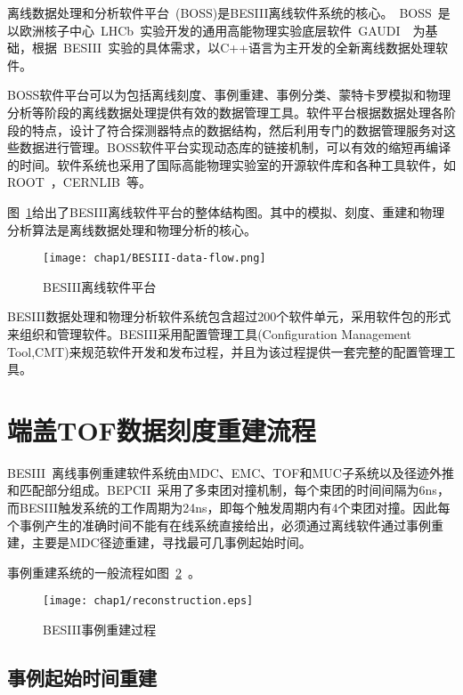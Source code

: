 离线数据处理和分析软件平台~\cite{liwd:2006}(BOSS)是BESIII离线软件系统的核心。~BOSS~是以欧洲核子中心~LHCb~实验开发的通用高能物理实验底层软件~GAUDI~~\cite{Barrand:2000}为基础，根据~BESIII~实验的具体需求，以C++语言为主开发的全新离线数据处理软件。

BOSS软件平台可以为包括离线刻度、事例重建、事例分类、蒙特卡罗模拟和物理分析等阶段的离线数据处理提供有效的数据管理工具。软件平台根据数据处理各阶段的特点，设计了符合探测器特点的数据结构，然后利用专门的数据管理服务对这些数据进行管理。BOSS软件平台实现动态库的链接机制，可以有效的缩短再编译的时间。软件系统也采用了国际高能物理实验室的开源软件库和各种工具软件，如ROOT~\cite{root}，CERNLIB~\cite{cern}等。


图~\ref{fig:BESIII-software}给出了BESIII离线软件平台的整体结构图。其中的模拟、刻度、重建和物理分析算法是离线数据处理和物理分析的核心。
\begin{figure}[!h]
  \centering
  \texttt{[image: chap1/BESIII-data-flow.png]}
  \caption{BESIII离线软件平台}
  \label{fig:BESIII-software}
\end{figure}

BESIII数据处理和物理分析软件系统包含超过200个软件单元，采用软件包的形式来组织和管理软件。BESIII采用配置管理工具(Configuration Management Tool,CMT)来规范软件开发和发布过程，并且为该过程提供一套完整的配置管理工具。%

\section{端盖TOF数据刻度重建流程}
BESIII~离线事例重建软件系统由MDC、EMC、TOF和MUC子系统以及径迹外推和匹配部分组成。BEPCII~采用了多束团对撞机制，每个束团的时间间隔为6ns，而BESIII触发系统的工作周期为24ns，即每个触发周期内有4个束团对撞。因此每个事例产生的准确时间不能有在线系统直接给出，必须通过离线软件通过事例重建，主要是MDC径迹重建，寻找最可几事例起始时间。

事例重建系统的一般流程如图~\ref{fig:reconstruction}~。

\begin{figure}[!h]
  \centering
  \texttt{[image: chap1/reconstruction.eps]}
  \caption{BESIII事例重建过程}
  \label{fig:reconstruction}
\end{figure}

\subsection{事例起始时间重建}

